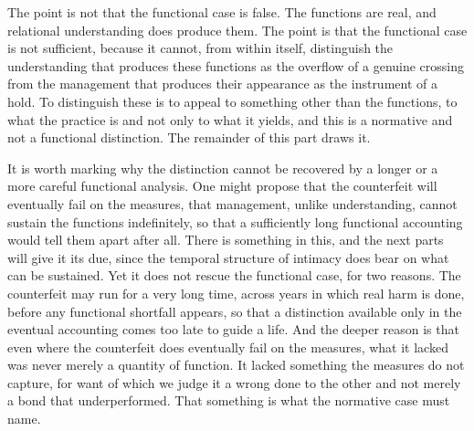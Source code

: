 The point is not that the functional case is false. The functions are real, and relational understanding does produce them. The point is that the functional case is not sufficient, because it cannot, from within itself, distinguish the understanding that produces these functions as the overflow of a genuine crossing from the management that produces their appearance as the instrument of a hold. To distinguish these is to appeal to something other than the functions, to what the practice is and not only to what it yields, and this is a normative and not a functional distinction. The remainder of this part draws it.

It is worth marking why the distinction cannot be recovered by a longer or a more careful functional analysis. One might propose that the counterfeit will eventually fail on the measures, that management, unlike understanding, cannot sustain the functions indefinitely, so that a sufficiently long functional accounting would tell them apart after all. There is something in this, and the next parts will give it its due, since the temporal structure of intimacy does bear on what can be sustained. Yet it does not rescue the functional case, for two reasons. The counterfeit may run for a very long time, across years in which real harm is done, before any functional shortfall appears, so that a distinction available only in the eventual accounting comes too late to guide a life. And the deeper reason is that even where the counterfeit does eventually fail on the measures, what it lacked was never merely a quantity of function. It lacked something the measures do not capture, for want of which we judge it a wrong done to the other and not merely a bond that underperformed. That something is what the normative case must name.

